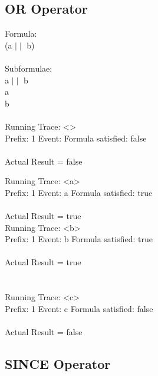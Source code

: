 \subsection{OR Operator}

Formula:\\
(a $\mid\mid$ b)\\
\\
Subformulae:\\
a $\mid\mid$ b\\
a\\
b\\
\\
Running Trace: \textless \textgreater\\
  Prefix: 1 Event:  Formula satisfied: false\\
\\
Actual Result = false\\

\newpage

\noindent Running Trace: \textless a\textgreater\\
  Prefix: 1 Event: a Formula satisfied: true\\
\\
Actual Result = true\\

\noindent Running Trace: \textless b\textgreater\\
  Prefix: 1 Event: b Formula satisfied: true\\
\\
Actual Result = true\\
\\
\\
Running Trace: \textless c\textgreater\\
  Prefix: 1 Event: c Formula satisfied: false\\
\\
Actual Result = false\\

\subsection{SINCE Operator}

